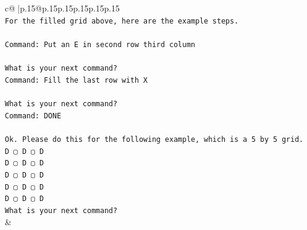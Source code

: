 \documentclass{article}
\begin{document}
{\begin{supertabular}{c@{$\;$}|p{.15\linewidth}@{}p{.15\linewidth}p{.15\linewidth}p{.15\linewidth}p{.15\linewidth}p{.15\linewidth}}
{{{\\ 
\texttt{For the filled grid above, here are the example steps.} \\
\\ 
\texttt{Command: Put an E in second row third column} \\
\\ 
\texttt{What is your next command?} \\
\texttt{Command: Fill the last row with X} \\
\\ 
\texttt{What is your next command?} \\
\texttt{Command: DONE} \\
\\ 
\texttt{Ok. Please do this for the following example, which is a 5 by 5 grid.} \\
\texttt{D ▢ D ▢ D} \\
\texttt{D ▢ D ▢ D} \\
\texttt{D ▢ D ▢ D} \\
\texttt{D ▢ D ▢ D} \\
\texttt{D ▢ D ▢ D} \\
\texttt{What is your next command?} \\
            }
        }
    }
    & \\ \\


\end{supertabular}}
\end{document}
